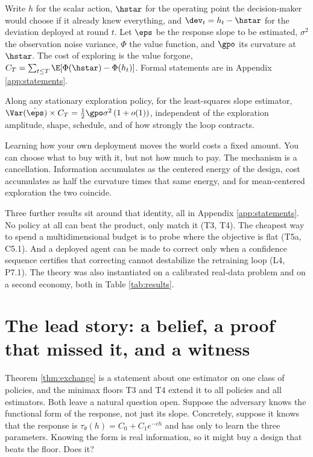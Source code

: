 \documentclass{article}
\begin{document}
Write $h$ for the scalar action, $\hstar$ for the operating point the
decision-maker would choose if it already knew everything, and
$\dev_t = h_t - \hstar$ for the deviation deployed at round $t$. Let $\eps$
be the response slope to be estimated, $\sigma^2$ the observation noise
variance, $\Phi$ the value function, and $\gpo$ its curvature at $\hstar$.
The cost of exploring is the value forgone,
$C_T = \sum_{t \le T}\E[\Phi(\hstar) - \Phi(h_t)]$. Formal statements are in
Appendix \ref{app:statements}.

\begin{theorem}
\label{thm:exchange}
Along any stationary exploration policy, for the least-squares slope
estimator,
$\Var(\hat\eps)\times C_T = \tfrac{1}{2}\gpo\sigma^2\,(1 + o(1))$,
independent of the exploration amplitude, shape, schedule, and of how
strongly the loop contracts.
\end{theorem}

Learning how your own deployment moves the world costs a fixed amount. You
can choose what to buy with it, but not how much to pay. The mechanism is a
cancellation. Information accumulates as the centered energy of the design,
cost accumulates as half the curvature times that same energy, and for
mean-centered exploration the two coincide.

Three further results sit around that identity, all in Appendix
\ref{app:statements}. No policy at all can beat the product, only match it
(T3, T4). The cheapest way to spend a multidimensional budget is to probe
where the objective is flat (T5a, C5.1). And a
deployed agent can be made to correct only when a confidence sequence
certifies that correcting cannot destabilize the retraining loop (L4, P7.1). The theory was also instantiated
on a calibrated real-data problem and on a second economy, both in Table
\ref{tab:results}.

\section{The lead story: a belief, a proof that missed it, and a witness}
\label{sec:t9}

Theorem \ref{thm:exchange} is a statement about one estimator on one class of
policies, and the minimax floors T3 and T4 extend it to all policies and
all estimators. Both leave a natural question open. Suppose the adversary knows
the functional form of the response, not just its slope. Concretely, suppose
it knows that the response is $\tau_\theta(h) = C_0 + C_1 e^{-ch}$ and has
only to learn the three parameters. Knowing the form is real information, so
it might buy a design that beats the floor. Does it?
\end{document}
